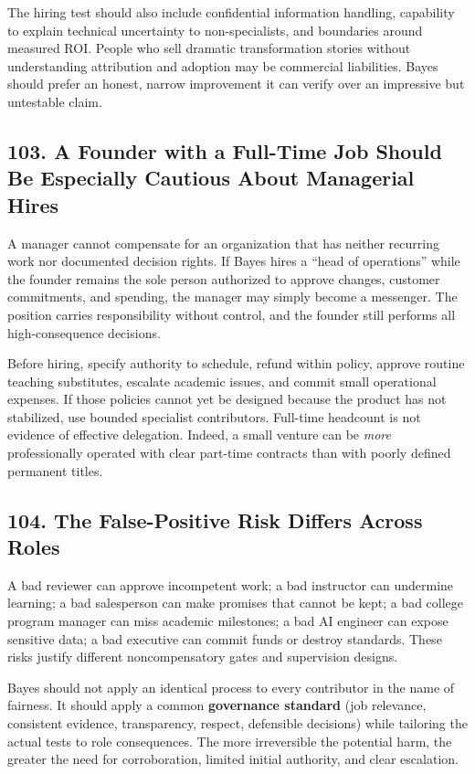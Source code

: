The hiring test should also include confidential information handling, capability to explain technical uncertainty to non-specialists, and boundaries around measured ROI. People who sell dramatic transformation stories without understanding attribution and adoption may be commercial liabilities. Bayes should prefer an honest, narrow improvement it can verify over an impressive but untestable claim.

\subsection*{103. A Founder with a Full-Time Job Should Be Especially Cautious About Managerial Hires}

A manager cannot compensate for an organization that has neither recurring work nor documented decision rights. If Bayes hires a ``head of operations'' while the founder remains the sole person authorized to approve changes, customer commitments, and spending, the manager may simply become a messenger. The position carries responsibility without control, and the founder still performs all high-consequence decisions.

Before hiring, specify authority to schedule, refund within policy, approve routine teaching substitutes, escalate academic issues, and commit small operational expenses. If those policies cannot yet be designed because the product has not stabilized, use bounded specialist contributors. Full-time headcount is not evidence of effective delegation. Indeed, a small venture can be \textit{more} professionally operated with clear part-time contracts than with poorly defined permanent titles.

\subsection*{104. The False-Positive Risk Differs Across Roles}

A bad reviewer can approve incompetent work; a bad instructor can undermine learning; a bad salesperson can make promises that cannot be kept; a bad college program manager can miss academic milestones; a bad AI engineer can expose sensitive data; a bad executive can commit funds or destroy standards. These risks justify different noncompensatory gates and supervision designs.

Bayes should not apply an identical process to every contributor in the name of fairness. It should apply a common \textbf{governance standard} (job relevance, consistent evidence, transparency, respect, defensible decisions) while tailoring the actual tests to role consequences. The more irreversible the potential harm, the greater the need for corroboration, limited initial authority, and clear escalation.

